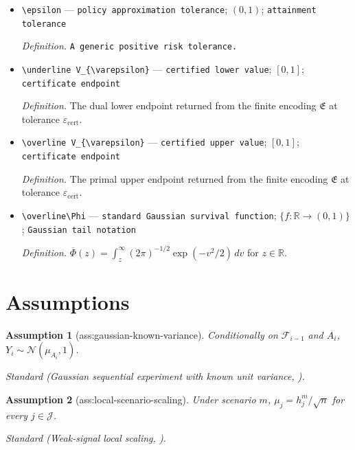 \documentclass{article}
\newtheorem{assumption}{Assumption}
\begin{document}
\begin{itemize}
  \item \texttt{\textbackslash{}\allowbreak{}epsilon} --- \texttt{policy approximation tolerance}; \((0,1)\); \texttt{attainment tolerance}
  \par\smallskip\noindent\emph{Definition.} \texttt{A generic positive risk tolerance.}
  \item \texttt{\textbackslash{}\allowbreak{}underline V\_\allowbreak{}\{\textbackslash{}\allowbreak{}varepsilon\}\allowbreak{}} --- \texttt{certified lower value}; \([0,1]\); \texttt{certificate endpoint}
  \par\smallskip\noindent\emph{Definition.} The dual lower endpoint returned from the finite encoding \(\mathfrak E\) at tolerance \(\varepsilon_{\mathrm{cert}}\).
  \item \texttt{\textbackslash{}\allowbreak{}overline V\_\allowbreak{}\{\textbackslash{}\allowbreak{}varepsilon\}\allowbreak{}} --- \texttt{certified upper value}; \([0,1]\); \texttt{certificate endpoint}
  \par\smallskip\noindent\emph{Definition.} The primal upper endpoint returned from the finite encoding \(\mathfrak E\) at tolerance \(\varepsilon_{\mathrm{cert}}\).
  \item \texttt{\textbackslash{}\allowbreak{}overline\textbackslash{}\allowbreak{}Phi} --- \texttt{standard Gaussian survival function}; \(\{f:\mathbb R\to(0,1)\}\); \texttt{Gaussian tail notation}
  \par\smallskip\noindent\emph{Definition.} \(\overline\Phi(z)=\int_z^\infty (2\pi)^{-1/2}\exp(-v^2/2)\,dv\) for \(z\in\mathbb R\).
\end{itemize}

\section{Assumptions}

\begin{assumption}[ass:gaussian-known-variance]\label{ass:gaussian-known-variance}
Conditionally on \(\mathcal F_{i-1}\) and \(A_i\), \(Y_i\sim\mathcal N(\mu_{A_i},1)\).
\par\smallskip\noindent\emph{Standard} (Gaussian sequential experiment with known unit variance, \cite{adusumilli2025riskPolicies}).
\end{assumption}

\begin{assumption}[ass:local-scenario-scaling]\label{ass:local-scenario-scaling}
Under scenario \(m\), \(\mu_j=h_j^m/\sqrt n\) for every \(j\in\mathcal J\).
\par\smallskip\noindent\emph{Standard} (Weak-signal local scaling, \cite{wagerxu2021diffusion}).
\end{assumption}
\end{document}
